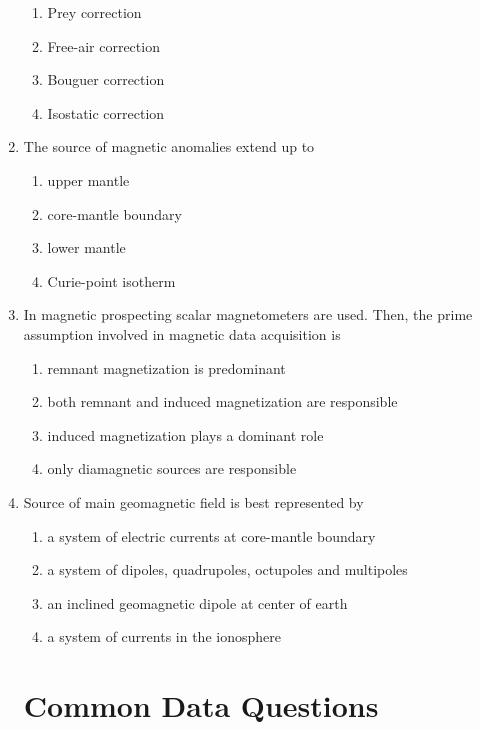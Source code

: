 \documentclass[journal,12pt,onecolumn]{IEEEtran}
\theoremstyle{remark}
\begin{document}
\begin{enumerate}[start = 21]
\begin{enumerate}
                \item Prey correction
                \item Free-air correction
                \item Bouguer correction
                \item Isostatic correction                
            \end{enumerate}
    \item The source of magnetic anomalies extend up to \hfill{} 
            \begin{enumerate}
                \item upper mantle
                \item core-mantle boundary
                \item lower mantle
                \item Curie-point isotherm                
            \end{enumerate}
    \item In magnetic prospecting scalar magnetometers are used. Then, the prime assumption involved in magnetic data acquisition is \hfill{} 
            \begin{enumerate}
                \item remnant magnetization is predominant
                \item both remnant and induced magnetization are responsible
                \item induced magnetization plays a dominant role
                \item only diamagnetic sources are responsible                 
            \end{enumerate}
    \item Source of main geomagnetic field is best represented by \hfill{} 
            \begin{enumerate}
                \item a system of electric currents at core-mantle boundary
                \item a system of dipoles, quadrupoles, octupoles and multipoles
                \item an inclined geomagnetic dipole at center of earth
                \item a system of currents in the ionosphere                
            \end{enumerate}
\section*{Common Data Questions}

\end{enumerate}
\end{document}
